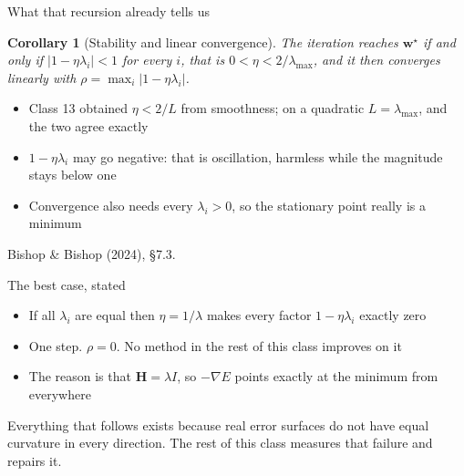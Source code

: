 \documentclass[aspectratio=169, 11pt]{beamer}
\newtheorem{corx}[theorem]{Corollary}
\newcommand{\srcline}[1]{%
  \par\vspace{0.25em}%
  {\scriptsize\color{mcMuted}\hfill #1\par}}
\newcommand{\src}[3]{}      %
\newcommand{\nosrc}{}       %
\begin{document}
\begin{frame}{What that recursion already tells us}
  \src{bishop2024}{section}{7.3}
  \vspace{-0.2em}
  \vspace{-0.3em}
  \begin{corx}[Stability and linear convergence]\label{th:stab}
    \small
    The iteration reaches $\mathbf{w}^\star$ if and only if
    $|1 - \eta\lambda_i| < 1$ for every $i$, that is
    $0 < \eta < 2/\lambda_{\max}$, and it then converges
    \alert{linearly} with $\rho = \max_i |1 - \eta\lambda_i|$.
  \end{corx}
  \vspace{0.3em}
  \begin{itemize}\itemsep0.35em
    \item Class 13 obtained $\eta < 2/L$ from smoothness; on a quadratic
          $L = \lambda_{\max}$, and the two agree exactly
    \item $1 - \eta\lambda_i$ may go \alert{negative}: that is
          oscillation, harmless while the magnitude stays below one
    \item Convergence also needs every $\lambda_i > 0$, so the stationary
          point really is a minimum
  \end{itemize}
  \srcline{Bishop \& Bishop (2024), \S7.3.}
\end{frame}

\begin{frame}{The best case, stated}
  \nosrc
  \vspace{0.3em}
  \begin{itemize}\itemsep0.45em
    \item If all $\lambda_i$ are equal then $\eta = 1/\lambda$ makes
          every factor $1 - \eta\lambda_i$ exactly zero
    \item One step. $\rho = 0$. No method in the rest of this class
          improves on it
    \item The reason is that $\mathbf{H} = \lambda I$, so $-\nabla E$ points
          \alert{exactly} at the minimum from everywhere
  \end{itemize}
  \vspace{0.6em}
  \begin{redhighlight}
    Everything that follows exists because real error surfaces do not
    have equal curvature in every direction. The rest of this class
    measures that failure and repairs it.
  \end{redhighlight}
\end{frame}
\end{document}
